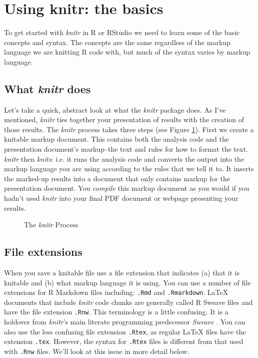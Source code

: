 \documentclass[krantz1]{krantz}
\begin{document}
\section{Using knitr: the basics}

To get started with {\emph{knitr}} in R or RStudio we need to learn some of the basic concepts and syntax. The concepts are the same regardless of the markup language we are knitting R code with, but much of the syntax varies by markup language.

\subsection{What \emph{knitr} does}

Let's take a quick, abstract look at what the \emph{knitr} package does. As I've mentioned, \emph{knitr} ties together your presentation of results with the creation of those results. The \emph{knitr} process takes three steps (see Figure \ref{KnitProcess}). First we create a knitable markup document. This contains both the analysis code and the presentation document's markup--the text and rules for how to format the text. \emph{knitr} then \emph{knits}: i.e. it runs the analysis code and converts the output into the markup language you are using according to the rules that we tell it to. It inserts the marked-up results into a document that only contains markup for the presentation document. You \emph{compile} this markup document as you would if you hadn't used \emph{knitr} into your final PDF document or webpage presenting your results. 

\begin{figure}
    \caption{The {\emph{knitr}} Process}
    \label{KnitProcess}
        \begin{center}
            
        \end{center}
\end{figure}

\subsection{File extensions}

When you save a knitable file use a file extension that indicates (a) that it is knitable and (b) what markup language it is using. You can use a number of file extensions for R Markdown files including: \texttt{.Rmd} and \texttt{.Rmarkdown}. LaTeX documents that include {\emph{knitr}} code chunks are generally called R Sweave files and have the file extension {\tt{.Rnw}}. This terminology is a little confusing. It is a holdover from {\emph{knitr}}'s main literate programming predecessor {\emph{Sweave}} \cite[]{Leisch2002}. You can also use the less confusing file extension \texttt{.Rtex}, as regular LaTeX files have the extension \texttt{.tex}. However, the syntax for \texttt{.Rtex} files is different from that used with \texttt{.Rnw} files. We'll look at this issue in more detail below.
\end{document}
